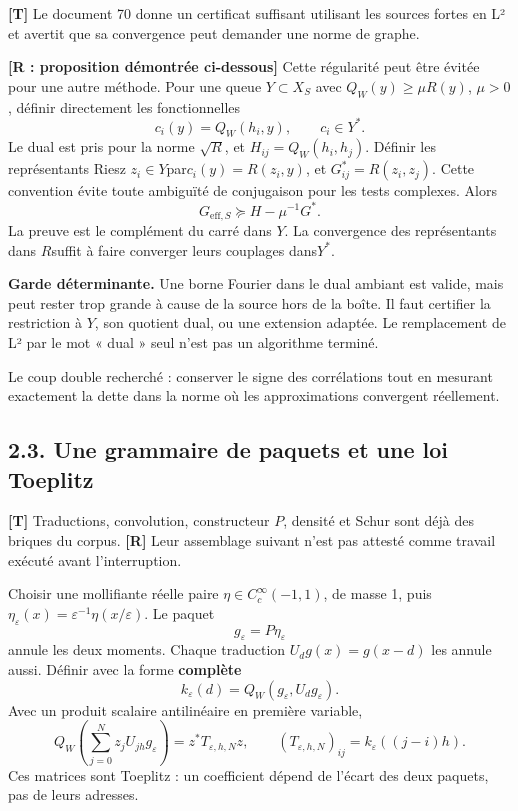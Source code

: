 \documentclass[
  10pt,
  a4paper,
]{article}
\begin{document}
\textbf{{[}T{]}} Le document 70 donne un certificat suffisant utilisant
les sources fortes en L² et avertit que sa convergence peut demander une
norme de graphe.

\textbf{{[}R : proposition démontrée ci-dessous{]}} Cette régularité
peut être évitée pour une autre méthode. Pour une queue \(Y\subset X_S\)
avec \(Q_W(y)\ge\mu R(y)\), \(\mu>0\), définir directement les
fonctionnelles \[
c_i(y)=Q_W(h_i,y),\qquad c_i\in Y^*.
\] Le dual est pris pour la norme \(\sqrt R\), et
\(H_{ij}=Q_W(h_i,h_j)\). Définir les représentants Riesz
\(z_i\in Y\)par\(c_i(y)=R(z_i,y)\), et \(G^*_{ij}=R(z_i,z_j)\). Cette
convention évite toute ambiguïté de conjugaison pour les tests
complexes. Alors \[
\boxed{G_{\mathrm{eff},S}\succeq H-\mu^{-1}G^*.}
\] La preuve est le complément du carré dans \(Y\). La convergence des
représentants dans \(R\)suffit à faire converger leurs couplages
dans\(Y^*\).

\textbf{Garde déterminante.} Une borne Fourier dans le dual ambiant est
valide, mais peut rester trop grande à cause de la source hors de la
boîte. Il faut certifier la restriction à \(Y\), son quotient dual, ou
une extension adaptée. Le remplacement de L² par le mot « dual » seul
n'est pas un algorithme terminé.

Le coup double recherché : conserver le signe des corrélations tout en
mesurant exactement la dette dans la norme où les approximations
convergent réellement.

\hypertarget{une-grammaire-de-paquets-et-une-loi-toeplitz}{%
\subsection{2.3. Une grammaire de paquets et une loi
Toeplitz}\label{une-grammaire-de-paquets-et-une-loi-toeplitz}}

\textbf{{[}T{]}} Traductions, convolution, constructeur \(P\), densité
et Schur sont déjà des briques du corpus. \textbf{{[}R{]}} Leur
assemblage suivant n'est pas attesté comme travail exécuté avant
l'interruption.

Choisir une mollifiante réelle paire \(\eta\in C_c^\infty(-1,1)\), de
masse 1, puis
\(\eta_\varepsilon(x)=\varepsilon^{-1}\eta(x/\varepsilon)\). Le paquet
\[
g_\varepsilon=P\eta_\varepsilon
\] annule les deux moments. Chaque traduction \(U_dg(x)=g(x-d)\) les
annule aussi. Définir avec la forme \textbf{complète} \[
k_\varepsilon(d)=Q_W(g_\varepsilon,U_dg_\varepsilon).
\] Avec un produit scalaire antilinéaire en première variable, \[
Q_W\!\left(\sum_{j=0}^N z_jU_{jh}g_\varepsilon\right)
=z^*T_{\varepsilon,h,N}z,\qquad
(T_{\varepsilon,h,N})_{ij}=k_\varepsilon((j-i)h).
\] Ces matrices sont Toeplitz : un coefficient dépend de l'écart des
deux paquets, pas de leurs adresses.
\end{document}

